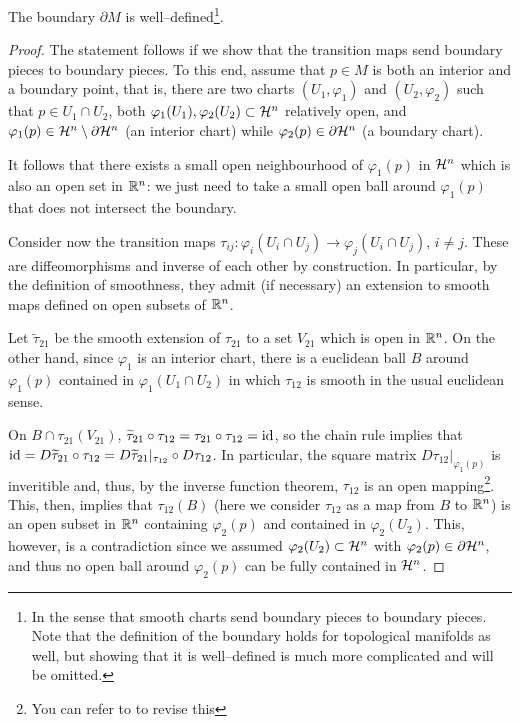 \begin{proposition}\label{prop:bdwelldef}
	The boundary $\partial M$ is well--defined\footnote{In the sense that smooth charts send boundary pieces to boundary pieces. Note that the definition of the boundary holds for topological manifolds as well, but showing that it is well--defined is much more complicated and will be omitted.}.
\end{proposition}
\begin{proof}
	The statement follows if we show that the transition maps send boundary pieces to boundary pieces.
	To this end, assume that $p\in M$ is both an interior and a boundary point, that is, there are two charts $(U_1, \varphi_1)$ and $(U_2,\varphi_2)$ such that $p \in U_1\cap U_2$, both $\varphi_1(U_1), \varphi_2(U_2) \subset\mathcal{H}^n$ relatively open, and $\varphi_1(p) \in \mathcal{H}^n\setminus\partial\mathcal{H}^n$ (an interior chart) while $\varphi_2(p) \in \partial\mathcal{H}^n$ (a boundary chart).

	It follows that there exists a small open neighbourhood of $\varphi_1(p)$ in $\mathcal{H}^n$ which is also an open set in $\mathbb{R}^n$: we just need to take a small open ball around $\varphi_1(p)$ that does not intersect the boundary.

	Consider now the transition maps $\tau_{ij} : \varphi_i(U_i\cap U_j) \to \varphi_j(U_i\cap U_j)$, $i\neq j$.
	These are diffeomorphisms and inverse of each other by construction.
	In particular, by the definition of smoothness, they admit (if necessary) an extension to smooth maps defined on open subsets of $\mathbb{R}^n$.

	Let $\widetilde\tau_{21}$ be the smooth extension of $\tau_{21}$ to a set $V_{21}$ which is open in $\mathbb{R}^n$.
	On the other hand, since $\varphi_1$ is an interior chart, there is a euclidean ball $B$ around $\varphi_1(p)$ contained in $\varphi_1(U_1\cap U_2)$ in which $\tau_{12}$ is smooth in the usual euclidean sense.

	On $B \cap \tau_{21}(V_{21})$, $\widetilde\tau_{21} \circ \tau_{12} = \tau_{21} \circ \tau_{12} = \operatorname{id}$, so the chain rule implies that $\operatorname{id} = D \widetilde\tau_{21} \circ \tau_{12} = D\widetilde\tau_{21}|_{\tau_{12}} \circ D\tau_{12}$.
	In particular, the square matrix $D\tau_{12}|_{\varphi_1(p)}$ is inveritible and, thus, by the inverse function theorem, $\tau_{12}$ is an open mapping\footnote{You can refer to \cite[Corollary C.36]{book:lee} to revise this}.
	This, then, implies that $\tau_{12}(B)$ (here we consider $\tau_{12}$ as a map from $B$ to $\mathbb{R}^n$) is an open subset in $\mathbb{R}^n$ containing $\varphi_2(p)$ and contained in $\varphi_2(U_2)$.
	This, however, is a contradiction since we assumed $\varphi_2(U_2)\subset\mathcal{H}^n$ with $\varphi_2(p) \in \partial\mathcal{H}^n$, and thus no open ball around $\varphi_2(p)$ can be fully contained in $\mathcal{H}^n$.
\end{proof}


